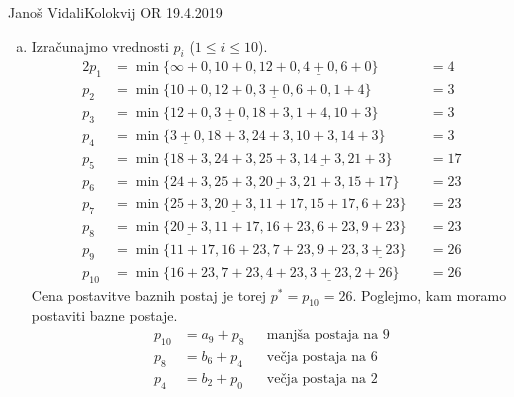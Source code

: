 \begin{naloga}{Janoš Vidali}{Kolokvij OR 19.4.2019}
\begin{odgovor}
\begin{enumerate}[(a)]
\item Izračunajmo vrednosti $p_i$ ($1 \le i \le 10$).
\begin{alignat*}{2}
p_1    &= \min\{\infty+0, 10+0, 12+0, \underline{4+0}, 6+0\}    &&= 4  \\
p_2    &= \min\{10+0, 12+0, \underline{3+0}, 6+0, 1+4\}         &&= 3  \\
p_3    &= \min\{12+0, \underline{3+0}, 18+3, 1+4, 10+3\}        &&= 3  \\
p_4    &= \min\{\underline{3+0}, 18+3, 24+3, 10+3, 14+3\}       &&= 3  \\
p_5    &= \min\{18+3, 24+3, 25+3, \underline{14+3}, 21+3\}      &&= 17 \\
p_6    &= \min\{24+3, 25+3, \underline{20+3}, 21+3, 15+17\}     &&= 23 \\
p_7    &= \min\{25+3, \underline{20+3}, 11+17, 15+17, 6+23\}    &&= 23 \\
p_8    &= \min\{\underline{20+3}, 11+17, 16+23, 6+23, 9+23\}    &&= 23 \\
p_9    &= \min\{11+17, 16+23, 7+23, 9+23, \underline{3+23}\}    &&= 26 \\
p_{10} &= \min\{16+23, 7+23, 4+23, \underline{3+23}, 2+26\}     &&= 26
\end{alignat*}
Cena postavitve baznih postaj je torej $p^* = p_{10} = 26$.
Poglejmo, kam moramo postaviti bazne postaje.
\begin{align*}
p_{10} &= a_9 + p_8 && \text{manjša postaja na $9$} \\
p_8    &= b_6 + p_4 && \text{večja postaja na $6$}  \\
p_4    &= b_2 + p_0 && \text{večja postaja na $2$}
\end{align*}
\end{enumerate}
\end{odgovor}
\end{naloga}
